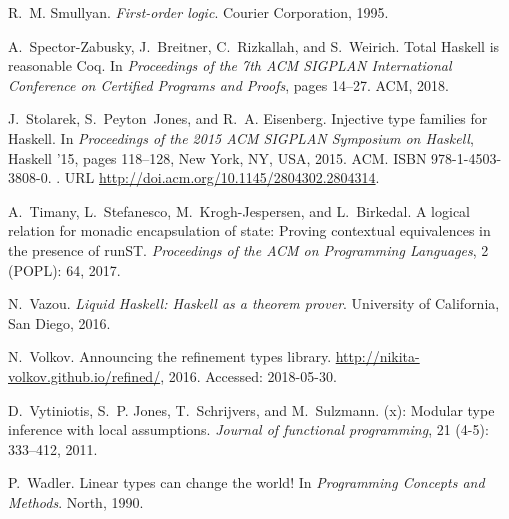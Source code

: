 \documentclass[format=sigplan, review=false, screen=true, 10pt]{acmart}
\begin{document}
\begin{thebibliography}{22}
R.~M. Smullyan.
\newblock \emph{First-order logic}.
\newblock Courier Corporation, 1995.




A.~Spector-Zabusky, J.~Breitner, C.~Rizkallah, and S.~Weirich.
\newblock Total {Haskell} is reasonable {Coq}.
\newblock In \emph{Proceedings of the 7th ACM SIGPLAN International Conference
  on Certified Programs and Proofs}, pages 14--27. ACM, 2018.


J.~Stolarek, S.~Peyton~Jones, and R.~A. Eisenberg.
\newblock Injective type families for {Haskell}.
\newblock In \emph{Proceedings of the 2015 ACM SIGPLAN Symposium on Haskell},
  Haskell '15, pages 118--128, New York, NY, USA, 2015. ACM.
\newblock ISBN 978-1-4503-3808-0.
\newblock {}.
\newblock URL \url{http://doi.acm.org/10.1145/2804302.2804314}.

A.~Timany, L.~Stefanesco, M.~Krogh-Jespersen, and L.~Birkedal.
\newblock A logical relation for monadic encapsulation of state: Proving
  contextual equivalences in the presence of {runST}.
\newblock \emph{Proceedings of the ACM on Programming Languages}, 2
  (POPL): 64, 2017.

N.~Vazou.
\newblock \emph{Liquid Haskell: Haskell as a theorem prover}.
\newblock University of California, San Diego, 2016.

N.~Volkov.
\newblock Announcing the refinement types library.
\newblock \url{http://nikita-volkov.github.io/refined/}, 2016.
\newblock Accessed: 2018-05-30.

D.~Vytiniotis, S.~P. Jones, T.~Schrijvers, and M.~Sulzmann.
(x): Modular type inference with local assumptions.
\newblock \emph{Journal of functional programming}, 21 (4-5):
  333--412, 2011.

P.~Wadler.
\newblock Linear types can change the world!
\newblock In \emph{Programming Concepts and Methods}. North, 1990.

\end{thebibliography}
\end{document}
